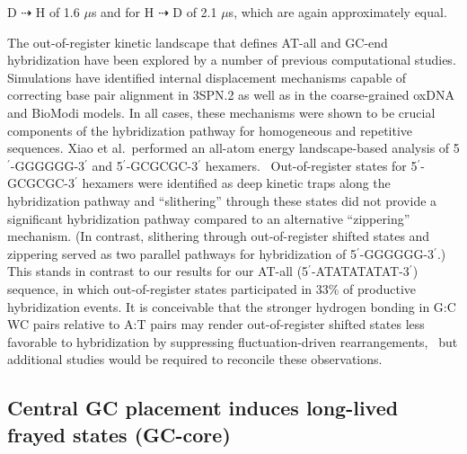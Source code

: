 \documentclass[journal=jpcbfk,manuscript=article]{achemso}
\begin{document}
D $\dashrightarrow$ H of 1.6 $\mu$s and for H $\dashrightarrow$ D of 2.1 $\mu$s, which are again approximately equal.

The out-of-register kinetic landscape that defines AT-all and GC-end hybridization have been explored by a number of previous computational studies. Simulations have identified internal displacement mechanisms capable of correcting base pair alignment in 3SPN.2 \citep{Hinckley2014Coarse-grainedEffects} as well as in the coarse-grained oxDNA \citep{Romano2013DNADependence} and BioModi \citep{Markegard2015} models. In all cases, these mechanisms were shown to be crucial components of the hybridization pathway for homogeneous and repetitive sequences. Xiao et al.\ performed an all-atom energy landscape-based analysis of 5$^\prime$-GGGGGG-3$^\prime$ and 5$^\prime$-GCGCGC-3$^\prime$ hexamers.~\citep{Xiao2019} Out-of-register states for 5$^\prime$-GCGCGC-3$^\prime$ hexamers were identified as deep kinetic traps along the hybridization pathway and ``slithering'' through these states did not provide a significant hybridization pathway compared to an alternative ``zippering'' mechanism. (In contrast, slithering through out-of-register shifted states and zippering served as two parallel pathways for hybridization of 5$^\prime$-GGGGGG-3$^\prime$.) This stands in contrast to our results for our AT-all (5$^\prime$-ATATATATAT-3$^\prime$) sequence, in which out-of-register states participated in 33\% of productive hybridization events. It is conceivable that the stronger hydrogen bonding in G:C WC pairs relative to A:T pairs may render out-of-register shifted states less favorable to hybridization by suppressing fluctuation-driven rearrangements,~\citep{Yakovchuk2006Base-stackingHelix,Zacharias2020Base-PairingFormation} but additional studies would be required to reconcile these observations.





\subsection{Central GC placement induces long-lived frayed states (GC-core)} \label{sec:GC-core}
\end{document}
